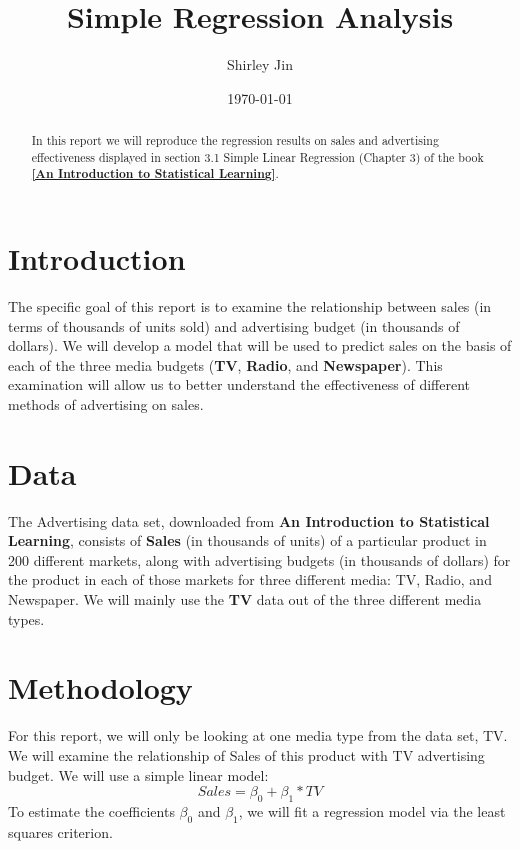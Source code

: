 \documentclass{article}
\title{Simple Regression Analysis}
\author{Shirley Jin}
\date{\today}
\begin{document}

\maketitle


\begin{abstract}
In this report we will reproduce the regression results on sales and advertising effectiveness displayed in section 3.1 Simple Linear Regression (Chapter 3) of the book \href{http://www-bcf.usc.edu/~gareth/ISL/}{\textbf{[An Introduction to Statistical Learning]}}.
\end{abstract}

\section{Introduction}

The specific goal of this report is to examine the relationship between sales (in terms of thousands of units sold) and advertising budget (in thousands of dollars). We will develop a model that will be used to predict sales on the basis of each of the three media budgets (\textbf{TV}, \textbf{Radio}, and \textbf{Newspaper}). This examination will allow us to better understand the effectiveness of different methods of advertising on sales.

\section{Data}

The Advertising data set, downloaded from \textbf{An Introduction to Statistical Learning}, consists of \textbf{Sales} (in thousands of units) of a particular product in 200 different markets, along with advertising budgets (in thousands of dollars) for the product in each of those markets for three different media: TV, Radio, and Newspaper. We will mainly use the \textbf{TV} data out of the three different media types.

\section{Methodology}

For this report, we will only be looking at one media type from the data set, TV. We will examine the relationship of Sales of this product with TV advertising budget. We will use a simple linear model:
\begin{equation}
 Sales  = \beta_0 + \beta_1 * TV
\end{equation}
To estimate the coefficients $\beta_0$ and $\beta_1$, we will fit a regression model via the least squares criterion.
\end{document}
